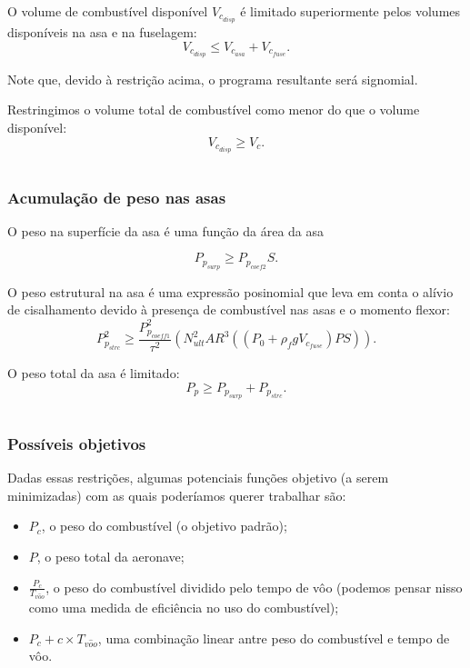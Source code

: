 \documentclass{article}
\begin{document}
O volume de combustível disponível $V_{c_{disp}}$ é limitado
superiormente pelos volumes disponíveis na asa e na fuselagem:
\[
  V_{c_{disp}} \leq V_{c_{asa}}+ V_{c_{fuse}}.
\]

\noindent Note que, devido à restrição acima, o programa resultante
será signomial.

Restringimos o volume total de combustível como menor do que o volume
disponível:
\[
  V_{c_{disp}} \geq V_c.
\]

\inputminted{python}{../Exemplos/Cap15/prog3_fvm.py}

\subsubsection{Acumulação de peso nas asas}

O peso na superfície da asa é uma função da área da asa

\[
  P_{p_{surp}} \geq P_{p_{coef2}}S.
\]

O peso estrutural na asa é uma expressão posinomial que leva em conta
o alívio de cisalhamento devido à presença de combustível nas asas e o
momento flexor:
\[
  P_{p_{strc}}^2 \geq \frac{P_{p_{coeff1}}^2}{\tau^2}(N_{ult}^2
  AR^3((P_0 + \rho_f g V_{c_{fuse}})PS)).
\]

O peso total da asa é limitado:
\[
  P_p \geq P_{p_{surp}} + P_{p_{strc}}.
\]

\inputminted{python}{../Exemplos/Cap15/prog4_wwb.py}

\subsubsection{Possíveis objetivos}

Dadas essas restrições, algumas potenciais funções objetivo (a serem
minimizadas) com as quais poderíamos querer trabalhar são:

\begin{itemize}
\item $P_c$, o peso do combustível (o objetivo padrão);
\item $P$, o peso total da aeronave;
\item $\frac{P_c}{T_{v\hat{o}o}}$, o peso do combustível dividido pelo
  tempo de vôo (podemos pensar nisso como uma medida de eficiência no
  uso do combustível);
\item $P_c + c \times T_{v\hat{o}o}$, uma combinação linear antre peso
  do combustível e tempo de vôo.
\end{itemize}
\end{document}
